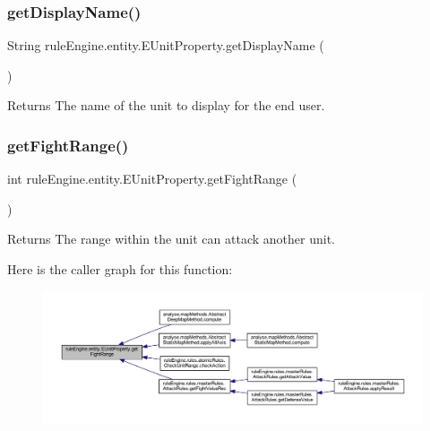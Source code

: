 \subsubsection{\texorpdfstring{get\+Display\+Name()}{getDisplayName()}}
{\footnotesize\ttfamily String rule\+Engine.\+entity.\+E\+Unit\+Property.\+get\+Display\+Name (\begin{DoxyParamCaption}{ }\end{DoxyParamCaption})\hspace{0.3cm}{\ttfamily [inline]}}

\begin{DoxyReturn}{Returns}
The name of the unit to display for the end user. 
\end{DoxyReturn}
\mbox{\label{enumrule_engine_1_1entity_1_1_e_unit_property_af85a56d807863d90dbbb3422b2cf627a}} 
\subsubsection{\texorpdfstring{get\+Fight\+Range()}{getFightRange()}}
{\footnotesize\ttfamily int rule\+Engine.\+entity.\+E\+Unit\+Property.\+get\+Fight\+Range (\begin{DoxyParamCaption}{ }\end{DoxyParamCaption})\hspace{0.3cm}{\ttfamily [inline]}}

\begin{DoxyReturn}{Returns}
The range within the unit can attack another unit. 
\end{DoxyReturn}
Here is the caller graph for this function\+:
\nopagebreak
\begin{figure}[H]
\begin{center}
\leavevmode
\includegraphics[width=350pt]{enumrule_engine_1_1entity_1_1_e_unit_property_af85a56d807863d90dbbb3422b2cf627a_icgraph}
\end{center}
\end{figure}
\mbox{\label{enumrule_engine_1_1entity_1_1_e_unit_property_ab4ed754cd27ac3abab4a2e3951da7005}} 
